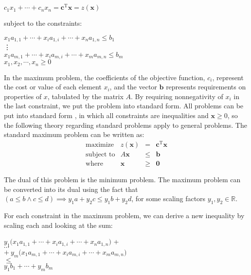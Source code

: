 \documentclass[12pt]{article}
\begin{document}
\begin{center}
     $c_1x_1 + \cdots + c_nx_n = \mathbf{c}^\text{T}\mathbf{x} = z(\mathbf{x})$\\
\end{center}

subject to the constraints:
\begin{center}
    $x_1a_{1,1} +  \cdots + x_ia_{1,i} + \cdots +  x_na_{1,n} \leq b_1$ \\
\hspace{0cm} \vdots \\
    $x_1a_{m,1} + \cdots + x_ia_{m,i} + \cdots +  x_ma_{m,n} \leq b_m$ \\
    $x_1, x_2, \cdots, x_n \geq 0$
\end{center} 

In the maximum problem, the coefficients of the objective function, $c_i$, represent the cost or value of each element $x_i$, and the vector $\mathbf{b}$ represents requirements on properties of $x$, tabulated by the matrix $A$. By requiring nonnegativity of $x_i$ in the last constraint, we put the problem into standard form. All problems can be put into standard form \cite{ferguson}, in which all constraints are inequalities and $\mathbf{x}\geq0$, so the following theory regarding standard problems apply to general problems. The standard maximum problem can be written as:
\begin{equation} \label{eq:maxprob}
    \begin{array}{rrcl}
        \text{maximize} & z(\mathbf{x}) & = & \mathbf{c}^\text{T} \mathbf{x} \\
        \text{subject\ to} & A \mathbf{x} & \leq & \mathbf{b} \\
        \text{where} & \mathbf{x} & \geq & \mathbf{0}
    \end{array}
\end{equation}

The dual of this problem is the minimum problem. The maximum problem can be converted into its dual using the fact that $(a \leq b \land c \leq d) \implies y_1a+y_2c \leq y_1b+y_2d$, for some scaling factors $y_1, y_2 \in \mathbb{R}$. 

For each constraint in the maximum problem, we can derive a new inequality by scaling each and looking at the sum:

\begin{center}
    $y_1\big(x_1a_{1,1} +  \cdots + x_ia_{1,i} + \cdots +  x_na_{1,n}\big)$ + \\
    $\cdots$ \\
    $+ \ y_m\big( x_1a_{m,1} + \cdots + x_ia_{m,i} + \cdots +  x_ma_{m,n} \big) $\\
    $ \leq$ \\
    $ y_1b_1  + \cdots +  y_mb_m$ 
\end{center} 
\end{document}
